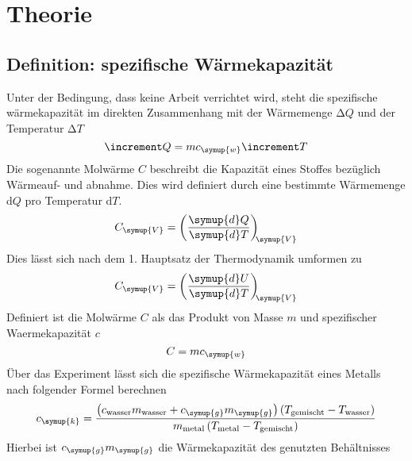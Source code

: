\section{Theorie}
\label{sec:Theorie}
\subsection{Definition: spezifische Wärmekapazität}
Unter der Bedingung, dass keine Arbeit verrichtet wird, steht die spezifische
wärmekapazität im direkten Zusammenhang mit der Wärmemenge $\increment Q$ und
der Temperatur $\increment T$
\begin{equation}
  \increment Q = mc_\symup{w}\increment T
\end{equation}
Die sogenannte Molwärme $C$ beschreibt die Kapazität eines Stoffes bezüglich
Wärmeauf- und abnahme. Dies wird definiert durch eine bestimmte Wärmemenge
d$Q$ pro Temperatur d$T$.
\begin{equation}
  C_\symup{V} = \left(\frac{\symup{d}Q}{\symup{d}T}\right)_{\!\!\symup{V}}
\end{equation}
Dies lässt sich nach dem 1. Hauptsatz der Thermodynamik umformen zu
\begin{equation}
  C_\symup{V} = \left(\frac{\symup{d}U}{\symup{d}T}\right)_{\!\!\symup{V}}
  \label{eqn:CVdif}
\end{equation}
Definiert ist die Molwärme $C$ als das Produkt von Masse $m$ und spezifischer
Waermekapazität $c$
\begin{equation}
  C = mc_\symup{w}
\end{equation}
Über das Experiment lässt sich die spezifische Wärmekapazität eines Metalls
nach folgender Formel berechnen
\begin{equation}
  c_\symup{k} = \frac{\left(c_\text{wasser}m_\text{wasser}+c_\symup{g}m_\symup{g}\right)
\left(T_\text{gemischt}-T_\text{wasser}\right)}{m_\text{metal}\left(T_\text{metal}-T_\text{gemischt}\right)}
\label{eqn:ckauswertung}
\end{equation}
Hierbei ist $c_\symup{g}m_\symup{g}$ die Wärmekapazität des genutzten
Behältnisses
